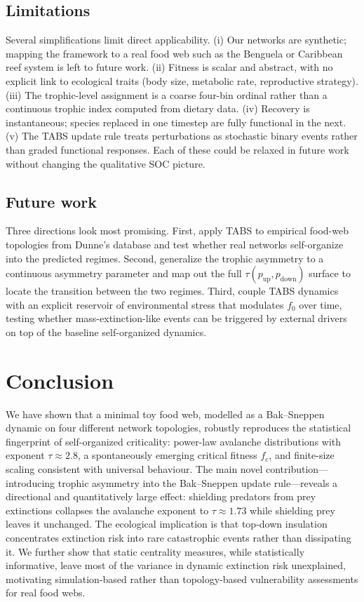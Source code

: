 \documentclass[10pt,a4paper,twocolumn]{article}
\begin{document}
\subsection{Limitations}
Several simplifications limit direct applicability. (i) Our networks are synthetic; mapping the framework to a real food web such as the Benguela or Caribbean reef system \citep{dunne2002foodweb} is left to future work. (ii) Fitness is scalar and abstract, with no explicit link to ecological traits (body size, metabolic rate, reproductive strategy). (iii) The trophic-level assignment is a coarse four-bin ordinal rather than a continuous trophic index computed from dietary data. (iv) Recovery is instantaneous; species replaced in one timestep are fully functional in the next. (v) The TABS update rule treats perturbations as stochastic binary events rather than graded functional responses. Each of these could be relaxed in future work without changing the qualitative SOC picture.

\subsection{Future work}
Three directions look most promising. First, apply TABS to empirical food-web topologies from Dunne's database \citep{dunne2002foodweb} and test whether real networks self-organize into the predicted regimes. Second, generalize the trophic asymmetry to a continuous asymmetry parameter and map out the full $\tau(p_{\text{up}}, p_{\text{down}})$ surface to locate the transition between the two regimes. Third, couple TABS dynamics with an explicit reservoir of environmental stress that modulates $f_0$ over time, testing whether mass-extinction-like events can be triggered by external drivers on top of the baseline self-organized dynamics.

\section{Conclusion}\label{sec:conclusion}
We have shown that a minimal toy food web, modelled as a Bak--Sneppen dynamic on four different network topologies, robustly reproduces the statistical fingerprint of self-organized criticality: power-law avalanche distributions with exponent $\tau \approx 2.8$, a spontaneously emerging critical fitness $f_c$, and finite-size scaling consistent with universal behaviour. The main novel contribution---introducing trophic asymmetry into the Bak--Sneppen update rule---reveals a directional and quantitatively large effect: shielding predators from prey extinctions collapses the avalanche exponent to $\tau \approx 1.73$ while shielding prey leaves it unchanged. The ecological implication is that top-down insulation concentrates extinction risk into rare catastrophic events rather than dissipating it. We further show that static centrality measures, while statistically informative, leave most of the variance in dynamic extinction risk unexplained, motivating simulation-based rather than topology-based vulnerability assessments for real food webs.
\end{document}
